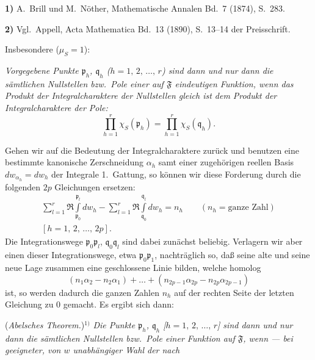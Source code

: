 \documentclass{article}
\begin{document}
\textbf{1)} A.~Brill und M.~Nöther, Mathematische Annalen Bd.~7 (1874), S.~283.

\textbf{2)} Vgl.\ Appell, Acta Mathematica Bd.~13 (1890), S.~13--14 der Preisschrift.

Insbesondere ($\mu_S = 1$):

\emph{Vorgegebene Punkte $\mathfrak{p}_h$, $\mathfrak{q}_h$ ($h = 1, \, 2, \, \dots, \, r$) sind dann und nur dann die sämtlichen Nullstellen bzw.\ Pole einer auf $\mathfrak{F}$ eindeutigen Funktion, wenn das Produkt der Integralcharaktere der Nullstellen gleich ist dem Produkt der Integralcharaktere der Pole:}
\[ \prod_{h=1}^r \chi_S(\mathfrak{p}_h) = \prod_{h=1}^r \chi_S(\mathfrak{q}_h). \]

Gehen wir auf die Bedeutung der Integralcharaktere zurück und benutzen eine bestimmte kanonische Zerschneidung $\alpha_h$ samt einer zugehörigen reellen Basis $dw_{\alpha_h} = dw_h$ der Integrale 1.\ Gattung, so können wir diese Forderung durch die folgenden $2p$ Gleichungen ersetzen:
\[ \begin{gathered}
\sum_{l=1}^r \Re \int\limits_{\mathfrak{p}_0}^{\mathfrak{p}_l} dw_h - \sum_{l=1}^r \Re \int\limits_{\mathfrak{q}_0}^{\mathfrak{q}_l} dw_h = n_h \qquad (n_h = \text{ganze Zahl}) \\
[h = 1, \, 2, \, \dots, \, 2p].
\end{gathered} \]
Die Integrationswege $\mathfrak{p}_0 \mathfrak{p}_l$, $\mathfrak{q}_0 \mathfrak{q}_l$ sind dabei zunächst beliebig. Verlagern wir aber einen dieser Integrationswege, etwa $\mathfrak{p}_0 \mathfrak{p}_1$, nachträglich so, daß seine alte und seine neue Lage zusammen eine geschlossene Linie bilden, welche homolog
\[ (n_1 \alpha_2 - n_2 \alpha_1) + \dots + (n_{2p-1} \alpha_{2p} - n_{2p} \alpha_{2p-1}) \]
ist, so werden dadurch die ganzen Zahlen $n_h$ auf der rechten Seite der letzten Gleichung zu $0$ gemacht. Es ergibt sich dann:

(\emph{Abelsches Theorem.})${}^{1)}$ \emph{Die Punkte $\mathfrak{p}_h$, $\mathfrak{q}_h$ [$h = 1, \, 2, \, \dots, \, r$] sind dann und nur dann die sämtlichen Nullstellen bzw.\ Pole einer Funktion auf $\mathfrak{F}$, wenn --- bei geeigneter, von $w$ unabhängiger Wahl der nach}
\end{document}
